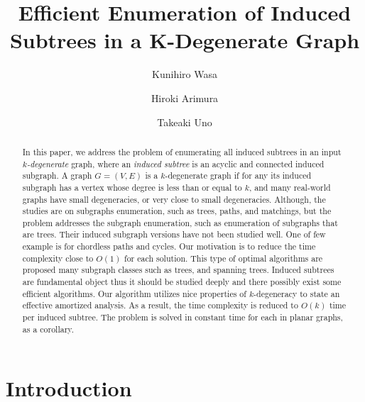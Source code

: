 \documentclass{llncs}
\newcommand{\name}[1]{\textit{#1}}
\begin{document}
\title{Efficient Enumeration of Induced Subtrees in a K-Degenerate Graph}


\author{Kunihiro Wasa \and Hiroki Arimura \and Takeaki Uno}
\maketitle

\begin{abstract}
    In this paper, 
    we address the problem of  
    enumerating all induced subtrees 
    in an input \name{$k$-degenerate} graph, 
    where an \name{induced subtree} is 
    an acyclic and connected induced subgraph. 
    A graph $G = (V, E)$ is a $k$-degenerate graph 
    if for any its induced subgraph has a vertex 
    whose degree is less than or equal to $k$, 
    and many real-world graphs have small degeneracies, 
    or very close to small degeneracies. 
    Although, the studies are on subgraphs enumeration, 
    such as trees, paths, and matchings, 
    but the problem addresses the subgraph
    enumeration, such as enumeration of subgraphs that are trees.
    Their induced subgraph versions have not been studied well.
    One of few example is for chordless paths and cycles.
    Our motivation is to reduce 
    the time complexity close to $O(1)$ for each solution. 
    This type of optimal algorithms are proposed 
    many subgraph classes such as trees, and spanning trees. 
    Induced subtrees are fundamental object 
    thus it should be studied deeply 
    and there possibly exist some efficient algorithms. 
    Our algorithm utilizes nice properties of $k$-degeneracy 
    to state an effective amortized analysis. 
    As a result, the time complexity is reduced to 
    $O(k)$ time per induced subtree. 
    The problem is solved in constant time for each in
    planar graphs, as a corollary. 
\end{abstract}




\section{Introduction}
\end{document}
